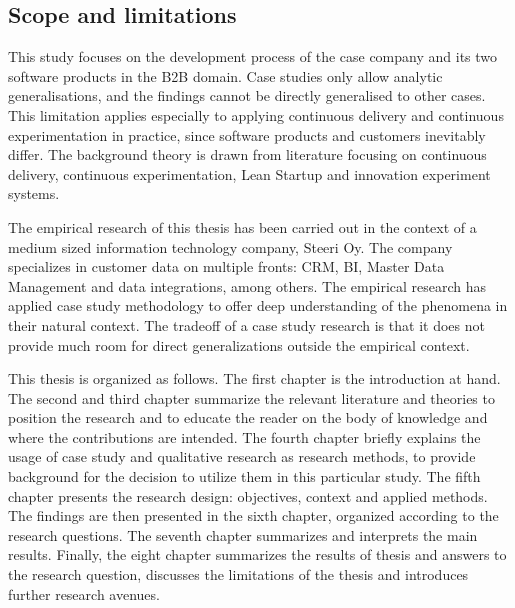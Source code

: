 \documentclass[english]{tktltiki2}
\theoremstyle{definition}
\theoremstyle{remark}
\begin{document}
\subsection{Scope and limitations}
This study focuses on the development process of the case company and its two software products in the B2B domain. Case studies only allow analytic generalisations, and the findings cannot be directly generalised to other cases. This limitation applies especially to applying continuous delivery and continuous experimentation in practice, since software products and customers inevitably differ. The background theory is drawn from literature focusing on continuous delivery, continuous experimentation, Lean Startup and innovation experiment systems. 

The empirical research of this thesis has been carried out in the context of a medium sized information technology company, Steeri Oy. The company specializes in customer data on multiple fronts: CRM, BI, Master Data Management and data integrations, among others. The empirical research has applied case study methodology to offer deep understanding of the phenomena in their natural context. The tradeoff of a case study research is that it does not provide much room for direct generalizations outside the empirical context. 

This thesis is organized as follows. The first chapter is the introduction at hand. The second and third chapter summarize the relevant literature and theories to position the research and to educate the reader on the body of knowledge and where the contributions are intended. The fourth chapter briefly explains the usage of case study and qualitative research as research methods, to provide background for the decision to utilize them in this particular study. The fifth chapter presents the research design: objectives, context and applied methods. The findings are then presented in the sixth chapter, organized according to the research questions. The seventh chapter summarizes and interprets the main results. Finally, the eight chapter summarizes the results of thesis and answers to the research question, discusses the limitations of the thesis and introduces further research avenues.
%
\end{document}
